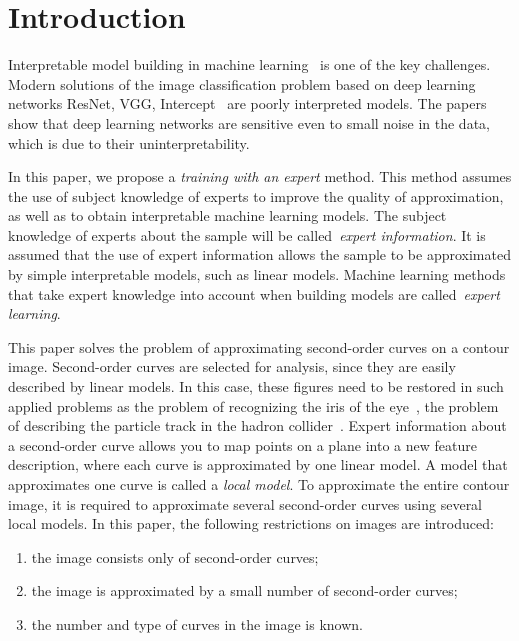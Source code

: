 \section{Introduction}
\label{intro}
Interpretable model building in machine learning~\cite{Ribeiro2016} is one of the key challenges.
Modern solutions of the image classification problem based on deep learning networks ResNet, VGG, Intercept~\cite{Kaiming2015} are poorly interpreted models.
The papers~\cite{Han2020, Xingjun2019, Akhtar2018} show that deep learning networks are sensitive even to small noise in the data, which is due to their uninterpretability.

In this paper, we propose a \textit {training with an expert} method.
This method assumes the use of subject knowledge of experts to improve the quality of approximation, as well as to obtain interpretable machine learning models.
The subject knowledge of experts about the sample will be called~\textit {expert information}.
It is assumed that the use of expert information allows the sample to be approximated by simple interpretable models, such as linear models. Machine learning methods that take expert knowledge into account when building models are called~\textit {expert learning}.

This paper solves the problem of approximating second-order curves on a contour image. Second-order curves are selected for analysis, since they are easily described by linear models. In this case, these figures need to be restored in such applied problems as the problem of recognizing the iris of the eye~\cite{Matveev2010, Matveev2014, Bowyer2010}, the problem of describing the particle track in the hadron collider~\cite{Dalila2018}. Expert information about a second-order curve allows you to map points on a plane into a new feature description, where each curve is approximated by one linear model. A model that approximates one curve is called a \textit {local model}. To approximate the entire contour image, it is required to approximate several second-order curves using several local models. In this paper, the following restrictions on images are introduced:
\begin{enumerate}
	\item the image consists only of second-order curves;
	\item the image is approximated by a small number of second-order curves;
	\item the number and type of curves in the image is known.
\end{enumerate}

